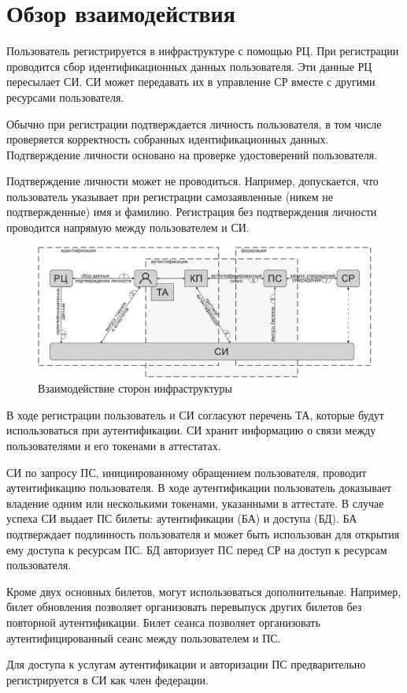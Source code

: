 ﻿\section{Обзор взаимодействия}\label{COMMON.Overview}

Пользователь регистрируется в инфраструктуре с помощью РЦ. При регистрации
проводится сбор идентификационных данных пользователя. Эти данные РЦ пересылает 
СИ. СИ может передавать их в управление СР вместе с другими ресурсами пользователя. 

Обычно при регистрации подтверждается личность пользователя, в том числе 
проверяется корректность собранных идентификационных данных. Подтверждение 
личности основано на проверке удостоверений пользователя.

Подтверждение личности может не проводиться. Например, допускается, что пользователь
указывает при регистрации самозаявленные (никем не подтвержденные) имя и
фамилию. Регистрация без подтверждения личности проводится напрямую между
пользователем и СИ.

\begin{figure}[hbt]
\begin{center}
\includegraphics[width=17cm]{../figs/bias}
\end{center}
\caption{Взаимодействие сторон инфраструктуры}
\label{Fig.COMMON.Bias}
\end{figure}


В ходе регистрации пользователь и СИ согласуют перечень ТА, которые будут 
использоваться при аутентификации. СИ хранит информацию о связи между 
пользователями и его токенами в аттестатах.

СИ по запросу ПС, инициированному обращением пользователя, проводит
аутентификацию пользователя. В ходе аутентификации пользователь доказывает
владение одним или несколькими токенами, указанными в аттестате.
%
В случае успеха СИ выдает ПС билеты: аутентификации (БА) и доступа (БД). 
%
БА подтверждает подлинность пользователя и может быть использован
для открытия ему доступа к ресурсам ПС.
%
БД авторизует ПС перед СР на доступ к ресурсам пользователя.

Кроме двух основных билетов, могут использоваться дополнительные.
Например, билет обновления позволяет организовать перевыпуск других билетов
без повторной аутентификации. Билет сеанса позволяет организовать 
аутентифицированный сеанс между пользователем и ПС.

Для доступа к услугам аутентификации и авторизации ПС предварительно 
регистрируется в СИ как член федерации.


